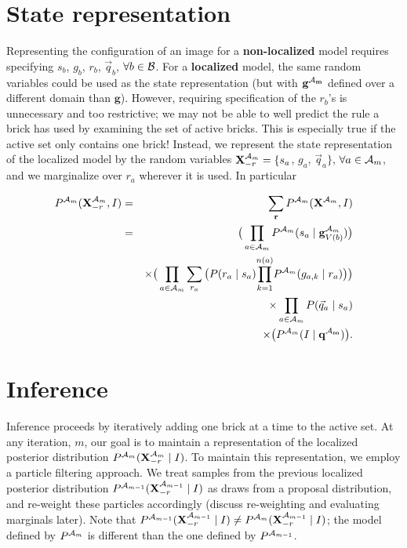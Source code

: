 \documentclass[11pt]{article}
\newcommand{\A}{{\cal A}}
\newcommand{\X}{\mathbf{X}}
\newcommand{\B}{\cal B}
\newcommand{\Xrm}{\X^{\Am}_{-r}}
\newcommand{\Am}{\A_{m}}
\newcommand{\qb}{\vec{q}_b}
\newcommand{\qa}{\vec{q}_a}
\begin{document}
\section*{State representation}

Representing the configuration of an image for a \textbf{non-localized} model requires specifying $s_b$, $g_b$, $r_b$, $\qb$, $\forall b \in \B$. For a \textbf{localized} model, the same random variables could be used as the state representation (but with $\mathbf{g^{\Am}}$ defined over a different domain than $\mathbf{g}$). However, requiring specification of the $r_b$'s is unnecessary and too restrictive; we may not be able to well predict the rule a brick has used by examining the set of active bricks. This is especially true if the active set only contains one brick! Instead, we represent the state representation of the localized model by the random variables $\Xrm = \{s_a$, $g_a$, $\qa\}$, $\forall a \in \Am$, and we marginalize over $r_a$ wherever it is used. In particular

\begin{eqnarray}
P^{\Am}(\Xrm, I) &=& \sum_{\mathbf{r}} P^{\Am}(\X^{\Am}, I)  \\
&=& \big( \prod_{a \in {\Am}} P^{\Am}(s_a \mid \mathbf{g}^{\Am}_{V({b})}) \big ) \label{eqn.localJointXrm} \\
& & \times \big( \prod_{a \in {\Am}} \sum_{r_a} \big(P(r_a \mid s_a) {\displaystyle \prod_{k=1}^{n(a)}} P^{\Am}(g_{a,k} \mid r_a) \big) \big) \nonumber \\
& & \times \prod_{a \in {\Am}} P(\qa \mid s_a) \nonumber \\
& & \times \big( P^{\Am}(I \mid \mathbf{q^{\Am}}) \big). \nonumber
\end{eqnarray}

\section*{Inference}

Inference proceeds by iteratively adding one brick at a time to the active set. At any iteration, $m$, our goal is to maintain a representation of the localized posterior distribution $P^{\Am}(\Xrm \mid I)$. To maintain this representation, we employ a particle filtering approach. We treat samples from the previous localized posterior distribution $P^{\A_{m-1}}(\X^{\A_{m-1}}_{-r} \mid I)$ as draws from a proposal distribution, and re-weight these particles accordingly (discuss re-weighting and evaluating marginals later). Note that $P^{\A_{m-1}}(\X^{\A_{m-1}}_{-r} \mid I) \neq P^{\A_{m}}(\X^{\A_{m-1}}_{-r} \mid I)$; the model defined by $P^{\A_{m}}$ is different than the one defined by $P^{\A_{m-1}}$.
\end{document}
